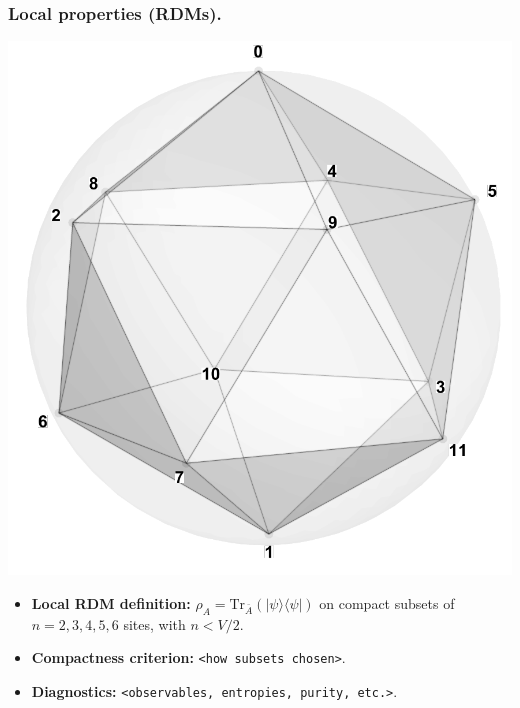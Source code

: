 \documentclass[11pt,a4paper]{article}
\begin{document}
\subsubsection*{Local properties (RDMs).}
\begin{center}
  \includegraphics[width=.6\linewidth]{icosahedron}
\end{center}

\begin{itemize}[leftmargin=1.5em]
  \item \textbf{Local RDM definition:} $\rho_A=\mathrm{Tr}_{\bar A}(|\psi\rangle\langle\psi|)$ on compact subsets of $n=2,3,4,5,6$ sites, with $n < V/2$.
  \item \textbf{Compactness criterion:} \texttt{<how subsets chosen>}.
  \item \textbf{Diagnostics:} \texttt{<observables, entropies, purity, etc.>}.
\end{itemize}

\end{document}
